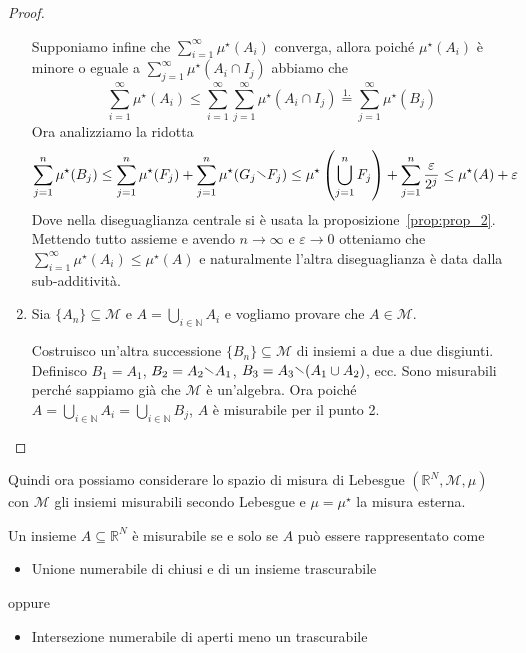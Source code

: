 \begin{proof}
\begin{enumerate}[label = \arabic*.]
        Supponiamo infine che \(\sum_{i=1}^{\infty} \mu^\star(A_{i}) \)
        converga, allora poiché \(\mu^\star(A_{i}) \) è minore o eguale a \( \sum_{j=1}^{\infty}
        \mu^\star(A_{i} \cap I_{j}) \) abbiamo che 
        \[
            \sum_{i=1}^{\infty} \mu^\star(A_{i}) \le \sum_{i=1}^{\infty}
            \sum_{j=1}^{\infty} \mu^\star(A_{i} \cap I_{j}) \overset{1.}{=}
            \sum_{j=1}^{\infty} \mu^\star(B_{j})
        \]
        Ora analizziamo la ridotta
        \[
            \sum_{j=1}^{n} \mu^\star(B_{j}) \le \sum_{j=1}^{n} \mu^\star(F_{j})
            + \sum_{j=1}^{n} \mu^\star(G_{j} \sminus F_{j})
            \le \mu^\star\left(
        \bigcup_{j = 1}^{n}F_{j}  \right) + \sum_{j=1}^{n}
        \frac{\varepsilon}{2^{j}} \le \mu^\star(A) + \varepsilon
        \]
        Dove nella diseguaglianza centrale si è usata la
        proposizione~\ref{prop:prop_2}. Mettendo tutto assieme e avendo \(n\to
        \infty\) e \(\varepsilon \to 0\)  otteniamo che
        \(\sum_{i=1}^{\infty} \mu^\star(A_{i}) \le \mu^\star(A)\) e naturalmente
        l'altra diseguaglianza è data dalla sub-additività.
    \item Sia \(\{A_{n}\} \subseteq   \mathcal{M}\) e \(A = \bigcup_{i \in
        \mathbb{N}} A_{i} \) e vogliamo provare che \(A \in \mathcal{M}\).

        Costruisco un'altra successione \(\{B_{n}\} \subseteq \mathcal{M}\) di
        insiemi a due a due disgiunti. Definisco \(B_{1} = A_{1}\), \(B_{2} =
        A_{2} \sminus A_{1}\), \(B_{3} = A_{3} \sminus (A_{1} \cup A_{2})\),
        ecc. Sono misurabili perché sappiamo già che \(\mathcal{M}\) è
        un'algebra. Ora poiché 
        \(
            A = \bigcup_{i \in \mathbb{N}} A_{i} = \bigcup_{i \in \mathbb{N}} B_{j}
        \), \(A\) è misurabile per il punto 2.
\end{enumerate}
\end{proof}
Quindi ora possiamo considerare lo spazio di misura di Lebesgue \(\left(
\mathbb{R}^{N}, \mathcal{M}, \mu \right) \) con \(\mathcal{M}\) gli insiemi
misurabili secondo Lebesgue e \(\mu = \mu^\star\) la misura esterna.
\begin{theorem}
    Un insieme \(A \subseteq \mathbb{R}^{N} \) è misurabile se e solo se \(A\)
    può essere rappresentato come
\begin{itemize}
    \item Unione numerabile di chiusi e di un insieme trascurabile
\end{itemize}
oppure 
\begin{itemize}
    \item Intersezione numerabile di aperti meno un trascurabile
\end{itemize}
\end{theorem}
